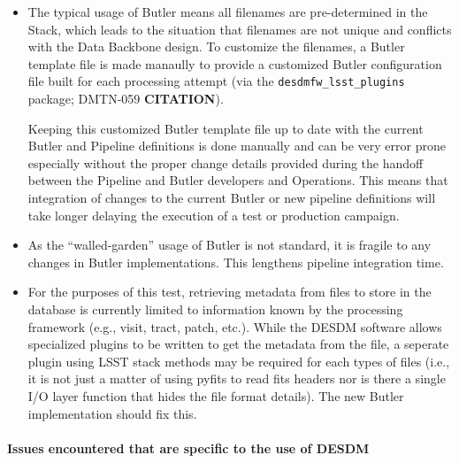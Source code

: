 \documentclass[DM,lsstdraft,STR,toc]{lsstdoc}
\begin{document}
\begin{itemize}

  \item{
    The typical usage of Butler means all filenames are pre-determined in the Stack, which leads to the situation that filenames are not unique and conflicts with the
    Data Backbone design.
    To customize the filenames, a Butler template file is made manaully to provide a customized Butler configuration file built for each processing attempt (via the \texttt{desdmfw{\_}lsst{\_}plugins} package; DMTN-059 \textbf{CITATION}).

    Keeping this customized Butler template file up to date with the current Butler and Pipeline definitions is done manually and can be very error prone especially without the proper change details provided during the handoff between the Pipeline and Butler developers and Operations.
    This means that integration of changes to the current Butler or new pipeline definitions will take longer delaying the execution of a test or production campaign.
  }

  \item{
    As the ``walled-garden'' usage of Butler is not standard, it is fragile to any changes in Butler implementations.
    This lengthens pipeline integration time.
  }

  \item{
    For the purposes of this test, retrieving metadata from files to store in the database is currently limited to information known by the processing framework (e.g., visit, tract, patch, etc.).
    While the DESDM software allows specialized plugins to be written to get the metadata from the file, a seperate plugin using LSST stack methods may be required for each types of files (i.e., it is not just a matter of using pyfits to read fits headers nor is there a single I/O layer function that hides the file format details).
    The new Butler implementation should fix this.
  }

\end{itemize}

\paragraph{Issues encountered that are specific to the use of DESDM}
\end{document}
